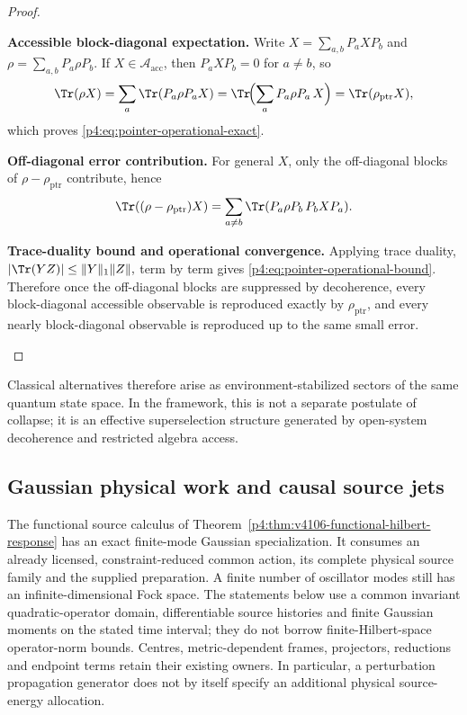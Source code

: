 \documentclass[12pt,a4paper]{article}
\begin{document}
\begin{proof}
\begin{proofsteps}

\item \textbf{Accessible block-diagonal expectation.}
Write \(X=\sum_{a,b}P_aXP_b\) and \(\rho=\sum_{a,b}P_a\rho P_b\).
If \(X\in\mathcal A_{\mathrm{acc}}\), then \(P_aXP_b=0\) for \(a\neq b\), so
\[
\Tr(\rho X)
=
\sum_a \Tr(P_a\rho P_a X)
=
\Tr\!\Bigl(\sum_a P_a\rho P_a\,X\Bigr)
=
\Tr(\rho_{\mathrm{ptr}}X),
\]
which proves \eqref{p4:eq:pointer-operational-exact}.

\item \textbf{Off-diagonal error contribution.}
For general \(X\), only the off-diagonal blocks of \(\rho-\rho_{\mathrm{ptr}}\) contribute, hence
\[
\Tr((\rho-\rho_{\mathrm{ptr}})X)
=
\sum_{a\neq b}\Tr(P_a\rho P_b\,P_bXP_a).
\]

\item \textbf{Trace-duality bound and operational convergence.}
Applying trace duality,
\(
|\Tr(YZ)|\le \|Y\|_1\|Z\|,
\)
term by term gives \eqref{p4:eq:pointer-operational-bound}.
Therefore once the off-diagonal blocks are suppressed by decoherence, every block-diagonal accessible observable is reproduced exactly by \(\rho_{\mathrm{ptr}}\), and every nearly block-diagonal observable is reproduced up to the same small error.
\end{proofsteps}

\end{proof}

Classical alternatives therefore arise as environment-stabilized sectors of the same quantum state space.
In the framework, this is not a separate postulate of collapse; it is an effective superselection structure generated by open-system decoherence and restricted algebra access.



\subsection{Gaussian physical work and causal source jets}
\label{p4:sec:v2203-gaussian-work}
The functional source calculus of
Theorem~\ref{p4:thm:v4106-functional-hilbert-response} has an exact
finite-mode Gaussian specialization.  It consumes an already licensed,
constraint-reduced common action, its complete physical source family and
the supplied preparation.  A finite number of oscillator modes still has
an infinite-dimensional Fock space.  The statements below use a common
invariant quadratic-operator domain, differentiable source histories and
finite Gaussian moments on the stated time interval; they do not borrow
finite-Hilbert-space operator-norm bounds.  Centres, metric-dependent
frames, projectors, reductions and endpoint terms retain their existing
owners.  In particular, a perturbation propagation generator does not by
itself specify an additional physical source-energy allocation.
\end{document}
